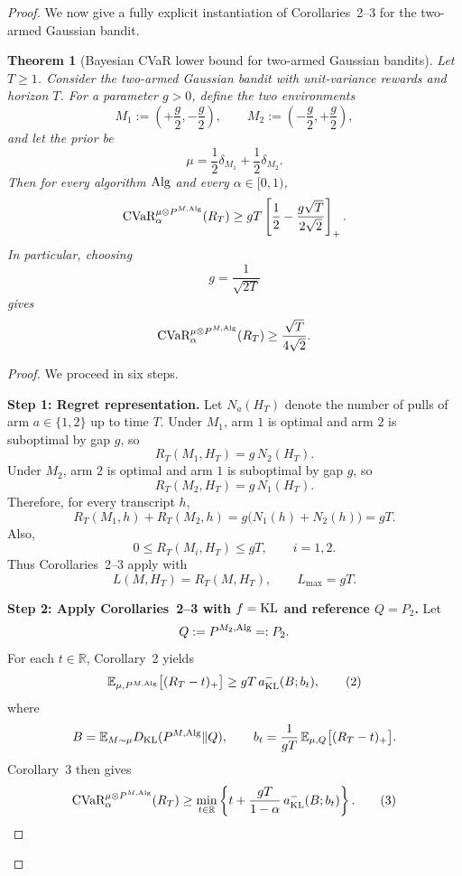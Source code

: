 \documentclass[conference]{IEEEtran}
\newtheorem{theorem}{Theorem}
\begin{document}
\begin{proof}[Proof]
\iffalse
We now give a fully explicit instantiation of Corollaries~2--3 for the two-armed Gaussian bandit.

\begin{theorem}[Bayesian \textup{CVaR} lower bound for two-armed Gaussian bandits]
\label{thm:two-armed-gaussian-cvar}
Let \(T\ge 1\). Consider the two-armed Gaussian bandit with unit-variance rewards and horizon \(T\). For a parameter \(g>0\), define the two environments
\[
M_1:=\left(+\frac{g}{2},-\frac{g}{2}\right),
\qquad
M_2:=\left(-\frac{g}{2},+\frac{g}{2}\right),
\]
and let the prior be
\[
\mu=\frac12\delta_{M_1}+\frac12\delta_{M_2}.
\]
Then for every algorithm \(\textup{Alg}\) and every \(\alpha\in[0,1)\),
\[
\textup{CVaR}_\alpha^{\mu\otimes P^{M,\textup{Alg}}}(R_T)
\ge
gT\left[\frac12-\frac{g\sqrt{T}}{2\sqrt{2}}\right]_+.
\]
In particular, choosing
\[
g=\frac{1}{\sqrt{2T}}
\]
gives
\[
\textup{CVaR}_\alpha^{\mu\otimes P^{M,\textup{Alg}}}(R_T)
\ge
\frac{\sqrt{T}}{4\sqrt{2}}.
\]
\end{theorem}

\begin{proof}
We proceed in six steps.

\medskip
\noindent
\textbf{Step 1: Regret representation.}
Let \(N_a(H_T)\) denote the number of pulls of arm \(a\in\{1,2\}\) up to time \(T\).
Under \(M_1\), arm \(1\) is optimal and arm \(2\) is suboptimal by gap \(g\), so
\[
R_T(M_1,H_T)=g\,N_2(H_T).
\]
Under \(M_2\), arm \(2\) is optimal and arm \(1\) is suboptimal by gap \(g\), so
\[
R_T(M_2,H_T)=g\,N_1(H_T).
\]
Therefore, for every transcript \(h\),
\[
R_T(M_1,h)+R_T(M_2,h)
=
g\bigl(N_1(h)+N_2(h)\bigr)
=
gT.
\tag{1}
\]
Also,
\[
0\le R_T(M_i,H_T)\le gT,
\qquad i=1,2.
\]
Thus Corollaries~2--3 apply with
\[
L(M,H_T)=R_T(M,H_T),
\qquad
L_{\max}=gT.
\]

\medskip
\noindent
\textbf{Step 2: Apply Corollaries~2--3 with \(f=\textup{KL}\) and reference \(Q=P_2\).}
Let
\[
Q:=P^{M_2,\textup{Alg}}=:P_2.
\]
For each \(t\in\mathbb{R}\), Corollary~2 yields
\[
\mathbb{E}_{\mu,P^{M,\textup{Alg}}}\big[(R_T-t)_+\big]
\ge
gT\,a^{-}_{\textup{KL}}(B;b_t),
\tag{2}
\]
where
\[
B
=
\mathbb{E}_{M\sim\mu}
D_{\textup{KL}}(P^{M,\textup{Alg}}\|Q),
\qquad
b_t
=
\frac{1}{gT}\,
\mathbb{E}_{\mu,Q}\big[(R_T-t)_+\big].
\]
Corollary~3 then gives
\[
\textup{CVaR}_\alpha^{\mu\otimes P^{M,\textup{Alg}}}(R_T)
\ge
\min_{t\in\mathbb{R}}
\left\{
t+\frac{gT}{1-\alpha}\,a^{-}_{\textup{KL}}(B;b_t)
\right\}.
\tag{3}
\]


\end{proof}
\end{proof}
\end{document}
